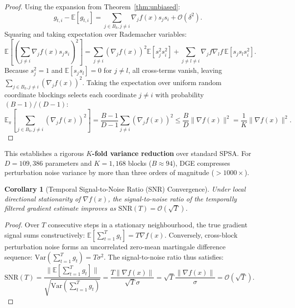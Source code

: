 \documentclass[11pt,a4paper]{article}
\newtheorem{corollary}[theorem]{Corollary}
\begin{document}
\begin{proof}
Using the expansion from Theorem~\ref{thm:unbiased}:
\begin{equation*}
g_{t,i} - \mathbb{E}[g_{t,i}] = \sum_{j \in B_k, j \neq i} \nabla_j f(x) s_j s_i + \mathcal{O}(\delta^2).
\end{equation*}
Squaring and taking expectation over Rademacher variables:
\begin{equation*}
\mathbb{E}\left[ \left( \sum_{j \neq i} \nabla_j f(x) s_j s_i \right)^2 \right] = \sum_{j \neq i} (\nabla_j f(x))^2 \mathbb{E}[s_j^2 s_i^2] + \sum_{j \neq l \neq i} \nabla_j f \nabla_l f \, \mathbb{E}[s_j s_l s_i^2].
\end{equation*}
Because $s_j^2 = 1$ and $\mathbb{E}[s_j s_l] = 0$ for $j \neq l$, all cross-terms vanish, leaving $\sum_{j \in B_k, j \neq i} (\nabla_j f(x))^2$. Taking the expectation over uniform random coordinate blockings selects each coordinate $j \neq i$ with probability $(B-1)/(D-1)$:
\begin{equation*}
\mathbb{E}_{\pi} \left[ \sum_{j \in B_k, j \neq i} (\nabla_j f(x))^2 \right] = \frac{B - 1}{D - 1} \sum_{j \neq i} (\nabla_j f(x))^2 \leq \frac{B}{D} \|\nabla f(x)\|^2 = \frac{1}{K} \|\nabla f(x)\|^2.
\end{equation*}
\end{proof}

\noindent This establishes a rigorous \textbf{$K$-fold variance reduction} over standard SPSA. For $D = 109{,}386$ parameters and $K = 1{,}168$ blocks ($B \approx 94$), DGE compresses perturbation noise variance by more than three orders of magnitude ($>1000\times$).

\begin{corollary}[Temporal Signal-to-Noise Ratio (SNR) Convergence]
\label{cor:snr}
Under local directional stationarity of $\nabla f(x)$, the signal-to-noise ratio of the temporally filtered gradient estimate improves as $\text{SNR}(T) = \mathcal{O}(\sqrt{T})$.
\end{corollary}

\begin{proof}
Over $T$ consecutive steps in a stationary neighbourhood, the true gradient signal sums constructively: $\mathbb{E}[\sum_{t=1}^T g_t] = T \nabla f(x)$. Conversely, cross-block perturbation noise forms an uncorrelated zero-mean martingale difference sequence: $\text{Var}(\sum_{t=1}^T g_t) = T \sigma^2$. The signal-to-noise ratio thus satisfies:
\begin{equation*}
\text{SNR}(T) = \frac{\|\mathbb{E}[\sum_{t=1}^T g_t]\|}{\sqrt{\text{Var}(\sum_{t=1}^T g_t)}} = \frac{T \|\nabla f(x)\|}{\sqrt{T} \sigma} = \sqrt{T} \frac{\|\nabla f(x)\|}{\sigma} = \mathcal{O}(\sqrt{T}).
\end{equation*}
\end{proof}
\end{document}
